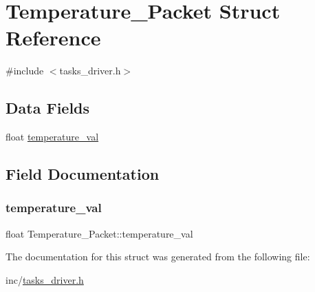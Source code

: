 \hypertarget{struct_temperature___packet}{}\section{Temperature\+\_\+\+Packet Struct Reference}
\label{struct_temperature___packet}


{\ttfamily \#include $<$tasks\+\_\+driver.\+h$>$}

\subsection*{Data Fields}
\begin{DoxyCompactItemize}
\item 
float \mbox{\hyperlink{struct_temperature___packet_a387dc244c8be62c75d3622e45f411195}{temperature\+\_\+val}}
\end{DoxyCompactItemize}


\subsection{Field Documentation}
\mbox{\label{struct_temperature___packet_a387dc244c8be62c75d3622e45f411195}} 
\subsubsection{\texorpdfstring{temperature\_val}{temperature\_val}}
{\footnotesize\ttfamily float Temperature\+\_\+\+Packet\+::temperature\+\_\+val}



The documentation for this struct was generated from the following file\+:\begin{DoxyCompactItemize}
\item 
inc/\mbox{\hyperlink{tasks__driver_8h}{tasks\+\_\+driver.\+h}}\end{DoxyCompactItemize}
